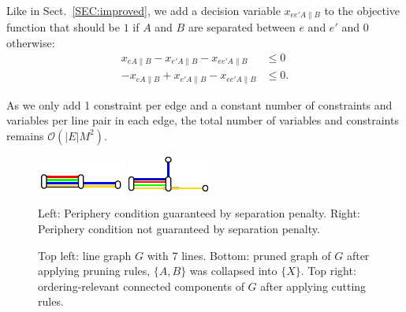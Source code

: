 \documentclass[format=acmsmall, review=false, screen=true]{acmart}
\begin{document}
Like in Sect.~\ref{SEC:improved}, we add a decision variable $x_{ee'A\|B}$ to the objective function that should be $1$ if $A$ and $B$ are separated between $e$ and $e'$ and $0$ otherwise:
\begin{align}
	x_{eA\|B} - x_{e'A\|B} - x_{ee'A\|B} &\leq 0 \\
	-x_{eA\|B} + x_{e'A\|B} - x_{ee'A\|B} &\leq 0.
\end{align}

As we only add 1 constraint per edge and a constant number of constraints and variables per line pair in each edge, the total number of variables and constraints remains $\mathcal{O}(|E|M^2)$.

\begin{figure}[b]
\centering
\begin{minipage}{.68\textwidth}
  \centering
  \includegraphics[trim={0 0.9 0 1.8},clip,width=.49\textwidth]{render_examples/periphery/periphery_example1.pdf}
  \hfill
  \includegraphics[width=.48\textwidth]{render_examples/periphery/periphery_example2.pdf}
  \caption{Left: Periphery condition guaranteed by separation penalty. Right: Periphery condition not guaranteed by separation penalty.}
  \label{FIG:periphery}
\end{minipage}
\end{figure}

\begin{figure}[t]
\centering
  
  \hfill
  
  \hfill
  
  \caption{Top left: line graph $G$ with 7 lines. Bottom: pruned graph of $G$ after applying pruning rules, $\{A, B\}$ was collapsed into $\{X\}$. Top right: ordering-relevant connected components of $G$ after applying cutting rules.}
  \label{FIG:coreoptimgraph}
\end{figure}
\end{document}
